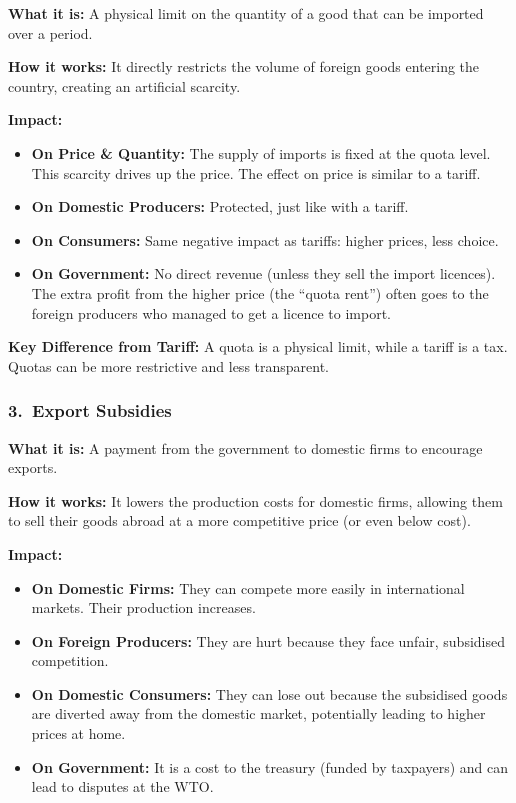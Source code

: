 \documentclass[11pt, a4paper, twoside]{book}
\begin{document}
\textbf{What it is:} A physical limit on the quantity of a good that can be imported over a period.

\textbf{How it works:} It directly restricts the volume of foreign goods entering the country, creating an artificial scarcity.

\textbf{Impact:}
\begin{itemize}
  \item \textbf{On Price \& Quantity:} The supply of imports is fixed at the quota level. This scarcity drives up the price. The effect on price is similar to a tariff.
  \item \textbf{On Domestic Producers:} Protected, just like with a tariff.
  \item \textbf{On Consumers:} Same negative impact as tariffs: higher prices, less choice.
  \item \textbf{On Government:} No direct revenue (unless they sell the import licences). The extra profit from the higher price (the ``quota rent'') often goes to the foreign producers who managed to get a licence to import.
\end{itemize}

\textbf{Key Difference from Tariff:} A quota is a physical limit, while a tariff is a tax. Quotas can be more restrictive and less transparent.

\subsubsection{3.\ Export Subsidies}

\textbf{What it is:} A payment from the government to domestic firms to encourage exports.

\textbf{How it works:} It lowers the production costs for domestic firms, allowing them to sell their goods abroad at a more competitive price (or even below cost).

\textbf{Impact:}
\begin{itemize}
  \item \textbf{On Domestic Firms:} They can compete more easily in international markets. Their production increases.
  \item \textbf{On Foreign Producers:} They are hurt because they face unfair, subsidised competition.
  \item \textbf{On Domestic Consumers:} They can lose out because the subsidised goods are diverted away from the domestic market, potentially leading to higher prices at home.
  \item \textbf{On Government:} It is a cost to the treasury (funded by taxpayers) and can lead to disputes at the WTO.
\end{itemize}
\end{document}
